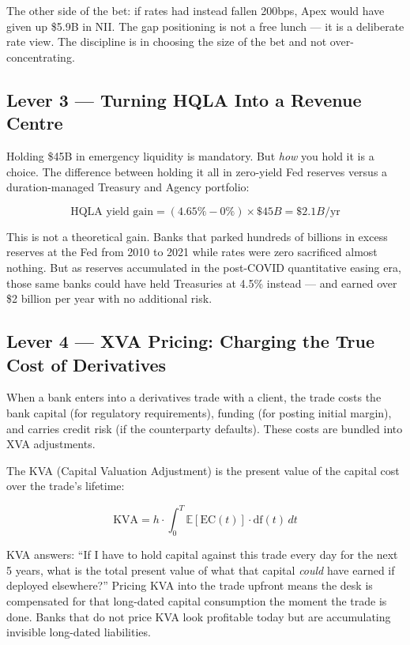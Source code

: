 \documentclass[12pt,a4paper]{article}
\newcommand{\E}{\mathbb{E}}
\begin{document}
The other side of the bet: if rates had instead fallen 200bps,
Apex would have given up \$5.9B in NII.  The gap positioning is not
a free lunch --- it is a deliberate rate view.  The discipline is in
choosing the size of the bet and not over-concentrating.

\subsection{Lever 3 --- Turning HQLA Into a Revenue Centre}

Holding \$45B in emergency liquidity is mandatory.  But \emph{how} you hold
it is a choice.  The difference between holding it all in zero-yield Fed
reserves versus a duration-managed Treasury and Agency portfolio:

\begin{equation}
  \text{HQLA yield gain} = (4.65\% - 0\%) \times \$45B = \$2.1B/\text{yr}
\end{equation}

\begin{mdframed}[style=plainenglish]
This is not a theoretical gain.  Banks that parked hundreds of billions
in excess reserves at the Fed from 2010 to 2021 while rates were zero
sacrificed almost nothing.  But as reserves accumulated in the post-COVID
quantitative easing era, those same banks could have held Treasuries at 4.5\%
instead --- and earned over \$2 billion per year with no additional risk.
\end{mdframed}

\subsection{Lever 4 --- XVA Pricing: Charging the True Cost of Derivatives}

When a bank enters into a derivatives trade with a client, the trade costs
the bank capital (for regulatory requirements), funding (for posting initial
margin), and carries credit risk (if the counterparty defaults).  These costs
are bundled into XVA adjustments.

The KVA (Capital Valuation Adjustment) is the present value of the capital
cost over the trade's lifetime:

\begin{equation}
  \text{KVA} = h \cdot \int_0^T \E[\text{EC}(t)] \cdot \text{df}(t)\, dt
\end{equation}

\begin{mdframed}[style=plainenglish]
KVA answers: ``If I have to hold capital against this trade every day for
the next 5 years, what is the total present value of what that capital
\emph{could} have earned if deployed elsewhere?''  Pricing KVA into the
trade upfront means the desk is compensated for that long-dated capital
consumption the moment the trade is done.  Banks that do not price KVA
look profitable today but are accumulating invisible long-dated liabilities.
\end{mdframed}
\end{document}
